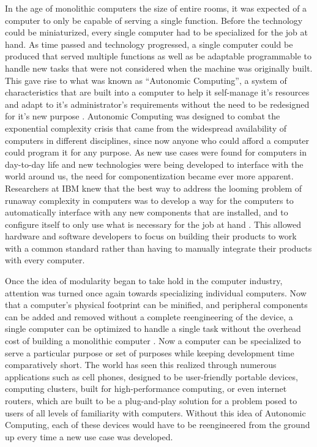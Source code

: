 In the age of monolithic computers the size of entire rooms, it was expected of a computer to only be capable of serving a single function.
Before the technology could be miniaturized, every single computer had to be specialized for the job at hand.
As time passed and technology progressed, a single computer could be produced that served multiple functions as well as be adaptable programmable to handle new tasks that were not considered when the machine was originally built.
This gave rise to what was known as \enquote{Autonomic Computing}, a system of characteristics that are built into a computer to help it self-manage it's resources and adapt to it's administrator's requirements without the need to be redesigned for it's new purpose \citep{AutonomicComputing}.
Autonomic Computing was designed to combat the exponential complexity crisis that came from the widespread availability of computers in different disciplines, since now anyone who could afford a computer could program it for any purpose.
As new use cases were found for computers in day-to-day life and new technologies were being developed to interface with the world around us, the need for componentization became ever more apparent.
Researchers at IBM knew that the best way to address the looming problem of runaway complexity in computers was to develop a way for the computers to automatically interface with any new components that are installed, and to configure itself to only use what is necessary for the job at hand \citep[p.~43]{AutonomicComputing}.
This allowed hardware and software developers to focus on building their products to work with a common standard rather than having to manually integrate their products with every computer.

Once the idea of modularity began to take hold in the computer industry, attention was turned once again towards specializing individual computers.
Now that a computer's physical footprint can be minified, and peripheral components can be added and removed without a complete reengineering of the device, a single computer can be optimized to handle a single task without the overhead cost of building a monolithic computer \citep{Burbeck2007ComplexityAT}.
Now a computer can be specialized to serve a particular purpose or set of purposes while keeping development time comparatively short.
The world has seen this realized through numerous applications such as cell phones, designed to be user-friendly portable devices, computing clusters, built for high-performance computing, or even internet routers, which are built to be a plug-and-play solution for a problem posed to users of all levels of familiarity with computers.
Without this idea of Autonomic Computing, each of these devices would have to be reengineered from the ground up every time a new use case was developed.

